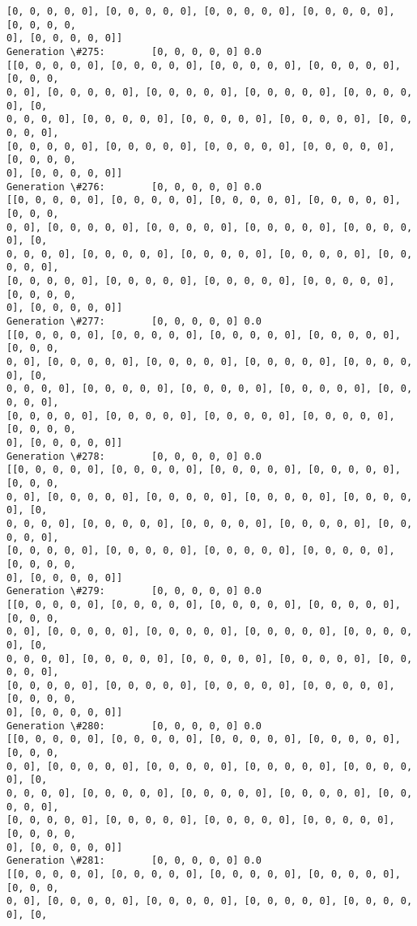 \documentclass[11pt]{article}
\begin{document}
\begin{Verbatim}[commandchars=\\\{\}]
[0, 0, 0, 0, 0], [0, 0, 0, 0, 0], [0, 0, 0, 0, 0], [0, 0, 0, 0, 0], [0, 0, 0, 0,
0], [0, 0, 0, 0, 0]]
Generation \#275:        [0, 0, 0, 0, 0] 0.0
[[0, 0, 0, 0, 0], [0, 0, 0, 0, 0], [0, 0, 0, 0, 0], [0, 0, 0, 0, 0], [0, 0, 0,
0, 0], [0, 0, 0, 0, 0], [0, 0, 0, 0, 0], [0, 0, 0, 0, 0], [0, 0, 0, 0, 0], [0,
0, 0, 0, 0], [0, 0, 0, 0, 0], [0, 0, 0, 0, 0], [0, 0, 0, 0, 0], [0, 0, 0, 0, 0],
[0, 0, 0, 0, 0], [0, 0, 0, 0, 0], [0, 0, 0, 0, 0], [0, 0, 0, 0, 0], [0, 0, 0, 0,
0], [0, 0, 0, 0, 0]]
Generation \#276:        [0, 0, 0, 0, 0] 0.0
[[0, 0, 0, 0, 0], [0, 0, 0, 0, 0], [0, 0, 0, 0, 0], [0, 0, 0, 0, 0], [0, 0, 0,
0, 0], [0, 0, 0, 0, 0], [0, 0, 0, 0, 0], [0, 0, 0, 0, 0], [0, 0, 0, 0, 0], [0,
0, 0, 0, 0], [0, 0, 0, 0, 0], [0, 0, 0, 0, 0], [0, 0, 0, 0, 0], [0, 0, 0, 0, 0],
[0, 0, 0, 0, 0], [0, 0, 0, 0, 0], [0, 0, 0, 0, 0], [0, 0, 0, 0, 0], [0, 0, 0, 0,
0], [0, 0, 0, 0, 0]]
Generation \#277:        [0, 0, 0, 0, 0] 0.0
[[0, 0, 0, 0, 0], [0, 0, 0, 0, 0], [0, 0, 0, 0, 0], [0, 0, 0, 0, 0], [0, 0, 0,
0, 0], [0, 0, 0, 0, 0], [0, 0, 0, 0, 0], [0, 0, 0, 0, 0], [0, 0, 0, 0, 0], [0,
0, 0, 0, 0], [0, 0, 0, 0, 0], [0, 0, 0, 0, 0], [0, 0, 0, 0, 0], [0, 0, 0, 0, 0],
[0, 0, 0, 0, 0], [0, 0, 0, 0, 0], [0, 0, 0, 0, 0], [0, 0, 0, 0, 0], [0, 0, 0, 0,
0], [0, 0, 0, 0, 0]]
Generation \#278:        [0, 0, 0, 0, 0] 0.0
[[0, 0, 0, 0, 0], [0, 0, 0, 0, 0], [0, 0, 0, 0, 0], [0, 0, 0, 0, 0], [0, 0, 0,
0, 0], [0, 0, 0, 0, 0], [0, 0, 0, 0, 0], [0, 0, 0, 0, 0], [0, 0, 0, 0, 0], [0,
0, 0, 0, 0], [0, 0, 0, 0, 0], [0, 0, 0, 0, 0], [0, 0, 0, 0, 0], [0, 0, 0, 0, 0],
[0, 0, 0, 0, 0], [0, 0, 0, 0, 0], [0, 0, 0, 0, 0], [0, 0, 0, 0, 0], [0, 0, 0, 0,
0], [0, 0, 0, 0, 0]]
Generation \#279:        [0, 0, 0, 0, 0] 0.0
[[0, 0, 0, 0, 0], [0, 0, 0, 0, 0], [0, 0, 0, 0, 0], [0, 0, 0, 0, 0], [0, 0, 0,
0, 0], [0, 0, 0, 0, 0], [0, 0, 0, 0, 0], [0, 0, 0, 0, 0], [0, 0, 0, 0, 0], [0,
0, 0, 0, 0], [0, 0, 0, 0, 0], [0, 0, 0, 0, 0], [0, 0, 0, 0, 0], [0, 0, 0, 0, 0],
[0, 0, 0, 0, 0], [0, 0, 0, 0, 0], [0, 0, 0, 0, 0], [0, 0, 0, 0, 0], [0, 0, 0, 0,
0], [0, 0, 0, 0, 0]]
Generation \#280:        [0, 0, 0, 0, 0] 0.0
[[0, 0, 0, 0, 0], [0, 0, 0, 0, 0], [0, 0, 0, 0, 0], [0, 0, 0, 0, 0], [0, 0, 0,
0, 0], [0, 0, 0, 0, 0], [0, 0, 0, 0, 0], [0, 0, 0, 0, 0], [0, 0, 0, 0, 0], [0,
0, 0, 0, 0], [0, 0, 0, 0, 0], [0, 0, 0, 0, 0], [0, 0, 0, 0, 0], [0, 0, 0, 0, 0],
[0, 0, 0, 0, 0], [0, 0, 0, 0, 0], [0, 0, 0, 0, 0], [0, 0, 0, 0, 0], [0, 0, 0, 0,
0], [0, 0, 0, 0, 0]]
Generation \#281:        [0, 0, 0, 0, 0] 0.0
[[0, 0, 0, 0, 0], [0, 0, 0, 0, 0], [0, 0, 0, 0, 0], [0, 0, 0, 0, 0], [0, 0, 0,
0, 0], [0, 0, 0, 0, 0], [0, 0, 0, 0, 0], [0, 0, 0, 0, 0], [0, 0, 0, 0, 0], [0,

\end{Verbatim}
\end{document}

